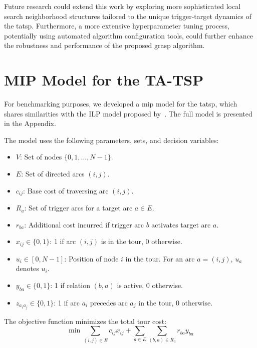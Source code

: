 \documentclass[twocolumn, switch]{article} %
\begin{document}
Future research could extend this work by exploring more sophisticated local search neighborhood structures tailored to the unique trigger-target dynamics of the \gls{tatsp}.
Furthermore, a more extensive hyperparameter tuning process, potentially using automated algorithm configuration tools, could further enhance the robustness and performance of the proposed \gls{grasp} algorithm.

\appendix
\section{MIP Model for the TA-TSP}
\label{sec:mip_model}
For benchmarking purposes, we developed a \gls{mip} model for the \gls{tatsp}, which shares similarities with the ILP model proposed by~\citet{Cerrone}.
The full model is presented in the Appendix.

The model uses the following parameters, sets, and decision variables:
\begin{itemize}
    \item $V$: Set of nodes $\{0, 1, \dots, N-1\}$.
    \item $E$: Set of directed arcs $(i,j)$.
    \item $c_{ij}$: Base cost of traversing arc $(i,j)$.
    \item $R_a$: Set of trigger arcs for a target arc $a \in E$.
    \item $r_{ba}$: Additional cost incurred if trigger arc $b$ activates target arc $a$.
    \item $x_{ij} \in \{0, 1\}$: 1 if arc $(i,j)$ is in the tour, 0 otherwise.
    \item $u_i \in [0, N-1]$: Position of node $i$ in the tour. For an arc $a=(i,j)$, $u_a$ denotes $u_i$.
    \item $y_{ba} \in \{0, 1\}$: 1 if relation $(b,a)$ is active, 0 otherwise.
    \item $z_{a_ia_j} \in \{0, 1\}$: 1 if arc $a_i$ precedes arc $a_j$ in the tour, 0 otherwise.
\end{itemize}

\footnotesize

The objective function minimizes the total tour cost:
\begin{equation} \label{eq:obj}
\min \sum_{(i,j) \in E} c_{ij} x_{ij} + \sum_{a \in E} \sum_{(b,a) \in R_a} r_{ba} y_{ba}
\end{equation}
\end{document}
